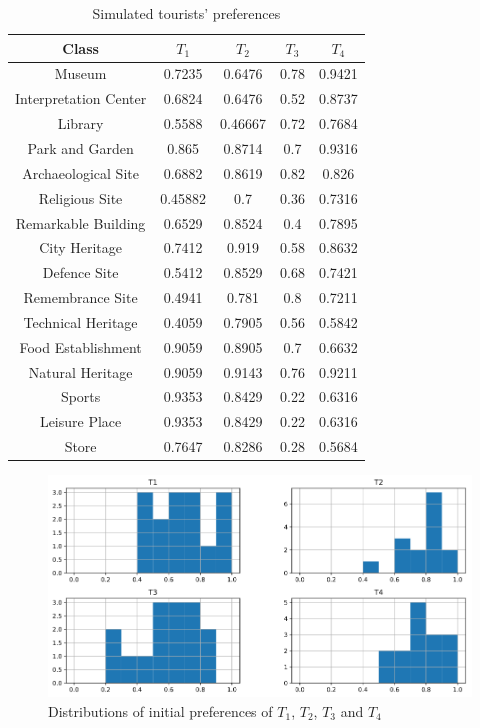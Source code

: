 \begin{table}[h!]
\centering
\caption{Simulated tourists' preferences}
\label{table:centroids}
\begin{tabular}{ |c|c|c|c|c| } 
    \hline
    Class & $T_1$ & $T_2$ & $T_3$ & $T_4$ \\
    \hline
    \hline

    Museum & 0.7235 & 0.6476 & 0.78 & 0.9421 \\ 
    \hline
    Interpretation Center & 0.6824 & 0.6476 & 0.52 & 0.8737 \\
    \hline
    Library & 0.5588 & 0.46667 & 0.72 & 0.7684 \\
    \hline
    Park and Garden & 0.865 & 0.8714 & 0.7 & 0.9316 \\
    \hline
    Archaeological Site & 0.6882 & 0.8619 & 0.82 & 0.826 \\
    \hline
    Religious Site & 0.45882 & 0.7 & 0.36 & 0.7316 \\
    \hline
    Remarkable Building & 0.6529 & 0.8524 & 0.4 & 0.7895 \\
    \hline
    City Heritage & 0.7412 & 0.919 & 0.58 & 0.8632 \\
    \hline
    Defence Site & 0.5412 & 0.8529 & 0.68 & 0.7421 \\
    \hline
    Remembrance Site & 0.4941 & 0.781 & 0.8 & 0.7211 \\
    \hline
    Technical Heritage & 0.4059 & 0.7905 & 0.56 & 0.5842 \\
    \hline
    Food Establishment & 0.9059 & 0.8905 & 0.7 & 0.6632 \\
    \hline
    Natural Heritage & 0.9059 & 0.9143 & 0.76 & 0.9211 \\
    \hline
    Sports & 0.9353 & 0.8429 & 0.22 & 0.6316 \\
    \hline
    Leisure Place & 0.9353 & 0.8429 & 0.22 & 0.6316 \\
    \hline
    Store & 0.7647 & 0.8286 & 0.28 & 0.5684 \\
    
    \hline
\end{tabular}
\end{table}

\begin{figure}[h]
    \centering
    \includegraphics[scale=0.25]{tourist_histogram.png}
    \caption{Distributions of initial preferences of $T_1$, $T_2$, $T_3$ and $T_4$}
    \label{fig:tourist_hist} 
\end{figure}

